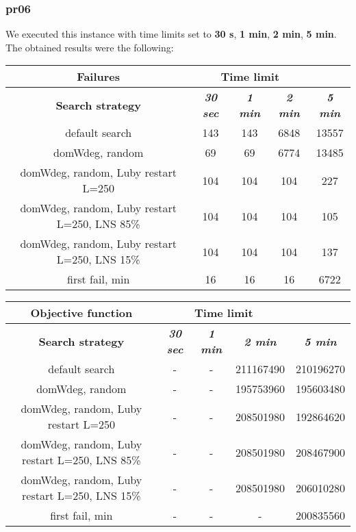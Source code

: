 \subsubsection{pr06}
We executed this instance with time limits set to \textbf{30 s}, \textbf{1 min}, \textbf{2 min}, \textbf{5 min}.\\
The obtained results were the following:
{
\renewcommand{\arraystretch}{2}
\begin{longtable}[h]{| c | c | c | c | c |}
    \hline
    \textbf{Failures} & \multicolumn{3}{c}{Time limit} & \\
    \hline
    \textbf{Search strategy} & \textbf{\textit{30 sec}} & \textbf{\textit{1 min}} & \textbf{\textit{2 min}} & \textbf{\textit{5 min}} \\
    \hline
    \endhead
    default search                                & 143 &  143 &  6848 & 13557 \\
    \hline
    domWdeg, random                               &  69 &   69 &  6774 & 13485 \\
    \hline
    domWdeg, random, Luby restart L=250           & 104 &  104 &  104 &    227 \\
    \hline
    domWdeg, random, Luby restart L=250, LNS 85\% & 104 &  104 &  104 &    105 \\
    \hline
    domWdeg, random, Luby restart L=250, LNS 15\% & 104 &  104 &  104 &    137 \\
    \hline
    first fail, min                               &  16 &   16 &   16 &   6722 \\
    \hline
\end{longtable}
}

{
\renewcommand{\arraystretch}{2}
\begin{longtable}[h]{| c | c | c | c | c |}
    \hline
    \textbf{Objective function} & \multicolumn{3}{c}{Time limit} & \\
    \hline
    \textbf{Search strategy} & \textbf{\textit{30 sec}} & \textbf{\textit{1 min}} & \textbf{\textit{2 min}} & \textbf{\textit{5 min}} \\
    \hline
    \endhead
    default search                                & - & - & 211167490 & 210196270 \\
    \hline
    domWdeg, random                               & - & - & 195753960 & 195603480 \\
    \hline
    domWdeg, random, Luby restart L=250           & - & - & 208501980 & 192864620 \\
    \hline
    domWdeg, random, Luby restart L=250, LNS 85\% & - & - & 208501980 & 208467900 \\
    \hline
    domWdeg, random, Luby restart L=250, LNS 15\% & - & - & 208501980 & 206010280 \\
    \hline
    first fail, min                               & - & - &         - & 200835560 \\
    \hline
\end{longtable}
}